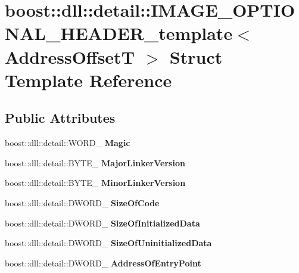 \hypertarget{a00149}{}\section{boost\+:\+:dll\+:\+:detail\+:\+:I\+M\+A\+G\+E\+\_\+\+O\+P\+T\+I\+O\+N\+A\+L\+\_\+\+H\+E\+A\+D\+E\+R\+\_\+template$<$ Address\+OffsetT $>$ Struct Template Reference}
\label{a00149}
\subsection*{Public Attributes}
\begin{DoxyCompactItemize}
\item 
boost\+::dll\+::detail\+::\+W\+O\+R\+D\+\_\+ {\bfseries Magic}\hypertarget{a00149_acaa65770064417f30dc73e6a3aed5758}{}\label{a00149_acaa65770064417f30dc73e6a3aed5758}

\item 
boost\+::dll\+::detail\+::\+B\+Y\+T\+E\+\_\+ {\bfseries Major\+Linker\+Version}\hypertarget{a00149_a0ddd4ddd0e85133b67a732a9b5cb50a3}{}\label{a00149_a0ddd4ddd0e85133b67a732a9b5cb50a3}

\item 
boost\+::dll\+::detail\+::\+B\+Y\+T\+E\+\_\+ {\bfseries Minor\+Linker\+Version}\hypertarget{a00149_aac0f854928e88ecddb8671f0992212f9}{}\label{a00149_aac0f854928e88ecddb8671f0992212f9}

\item 
boost\+::dll\+::detail\+::\+D\+W\+O\+R\+D\+\_\+ {\bfseries Size\+Of\+Code}\hypertarget{a00149_a05f3466faf36daea3c6e3f298ffcb57b}{}\label{a00149_a05f3466faf36daea3c6e3f298ffcb57b}

\item 
boost\+::dll\+::detail\+::\+D\+W\+O\+R\+D\+\_\+ {\bfseries Size\+Of\+Initialized\+Data}\hypertarget{a00149_a6cdeb05a2e3d8836d60ed324db2a7dfb}{}\label{a00149_a6cdeb05a2e3d8836d60ed324db2a7dfb}

\item 
boost\+::dll\+::detail\+::\+D\+W\+O\+R\+D\+\_\+ {\bfseries Size\+Of\+Uninitialized\+Data}\hypertarget{a00149_af9f128f5c560e0922e85840049319b53}{}\label{a00149_af9f128f5c560e0922e85840049319b53}

\item 
boost\+::dll\+::detail\+::\+D\+W\+O\+R\+D\+\_\+ {\bfseries Address\+Of\+Entry\+Point}\hypertarget{a00149_a58d74a4050edd2858c03cb5c984ac5af}{}\label{a00149_a58d74a4050edd2858c03cb5c984ac5af}


\end{DoxyCompactItemize}
